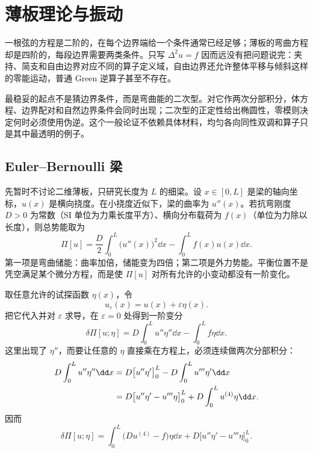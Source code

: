 \chapter{薄板理论与振动}
\label{chap:phys-cont-biharmonic}

一根弦的方程是二阶的，在每个边界端给一个条件通常已经足够；薄板的弯曲方程却是四阶的，每段边界需要两类条件。只写 \(\Delta^2u=f\) 因而远没有把问题说完：夹持、简支和自由边界对应不同的算子定义域，自由边界还允许整体平移与倾斜这样的零能运动，普通 Green 逆算子甚至不存在。

最稳妥的起点不是猜边界条件，而是弯曲能的二次型。对它作两次分部积分，体方程、边界配对和自然边界条件会同时出现；二次型的正定性给出椭圆性，零模则决定何时必须使用伪逆。这个一般论证不依赖具体材料，均匀各向同性双调和算子只是其中最透明的例子。

\section{Euler--Bernoulli 梁}

先暂时不讨论二维薄板，只研究长度为 \(L\) 的细梁。设 \(x\in[0,L]\) 是梁的轴向坐标，\(u(x)\) 是横向挠度。在小挠度近似下，梁的曲率为 \(u''(x)\)。若抗弯刚度 \(D>0\) 为常数（SI 单位为力乘长度平方）、横向分布载荷为 \(f(x)\)（单位为力除以长度），则总势能取为
\begin{equation}
 \Pi[u]
 =\frac{D}{2}\int_0^L\bigl(u''(x)\bigr)^2\dd x
 -\int_0^L f(x)u(x)\dd x.
 \label{eq:phys-cont-beam-energy}
\end{equation}
第一项是弯曲储能：曲率加倍，储能变为四倍；第二项是外力势能。平衡位置不是凭空满足某个微分方程，而是使 \(\Pi[u]\) 对所有允许的小变动都没有一阶变化。

取任意允许的试探函数 \(\eta(x)\)，令
\[
 u_\varepsilon(x)=u(x)+\varepsilon\eta(x).
\]
把它代入并对 \(\varepsilon\) 求导，在 \(\varepsilon=0\) 处得到一阶变分
\[
 \delta\Pi[u;\eta]
 =D\int_0^L u''\eta''\dd x-\int_0^L f\eta\dd x.
\]
这里出现了 \(\eta''\)，而要让任意的 \(\eta\) 直接乘在方程上，必须连续做两次分部积分：
\begin{align}
 D\int_0^L u''\eta''\dd x
 &=D\bigl[u''\eta'\bigr]_0^L-D\int_0^L u'''\eta'\dd x\notag\\
 &=D\bigl[u''\eta'-u'''\eta\bigr]_0^L
 +D\int_0^L u^{(4)}\eta\dd x.
 \label{eq:phys-cont-beam-two-integrations}
\end{align}
因而
\begin{equation}
 \delta\Pi[u;\eta]
 =\int_0^L\bigl(Du^{(4)}-f\bigr)\eta\dd x
 +D\bigl[u''\eta'-u'''\eta\bigr]_0^L.
 \label{eq:phys-cont-beam-first-variation}
\end{equation}

